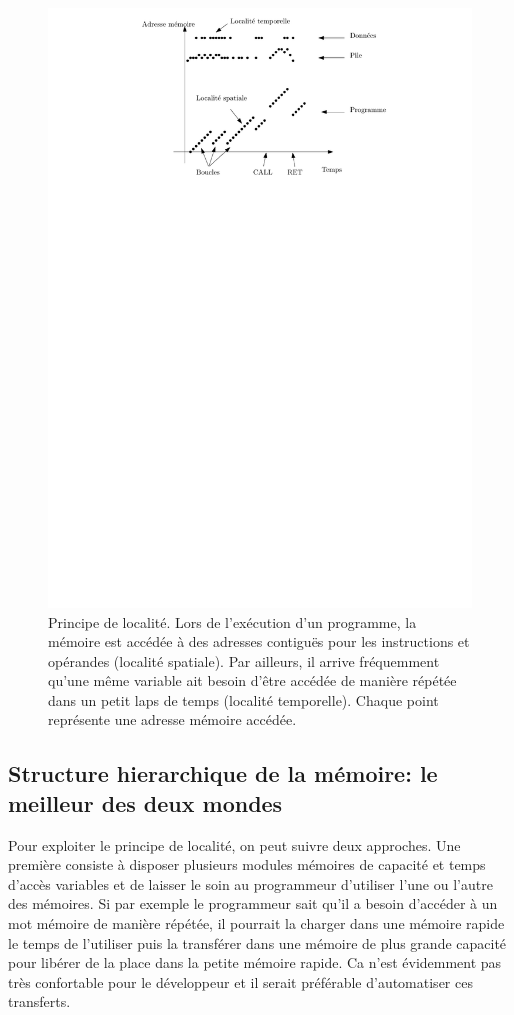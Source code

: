 \begin{figure}[htbp]
\centering\includegraphics[width=0.5\linewidth]{Figs/localite.pdf}
\caption{\label{fig:localite} Principe de localité. Lors de l'exécution d'un programme, la mémoire est accédée à des adresses contiguës pour les instructions et opérandes (localité spatiale). Par ailleurs, il arrive fréquemment qu'une même variable ait besoin d'être accédée de manière répétée dans un petit laps de temps (localité temporelle). Chaque point représente une adresse mémoire accédée.}
\end{figure}


\subsection{Structure hierarchique de la mémoire: le meilleur des deux mondes}

Pour exploiter le principe de localité, on peut suivre deux approches. Une première consiste à disposer plusieurs modules mémoires de capacité et temps d'accès variables et de laisser le soin au programmeur d'utiliser l'une ou l'autre des mémoires. Si par exemple le programmeur sait qu'il a besoin d'accéder à un mot mémoire de manière répétée, il pourrait la charger dans une mémoire rapide le temps de l'utiliser puis la transférer dans une mémoire de plus grande capacité pour libérer de la place dans la petite mémoire rapide. Ca n'est évidemment pas très confortable pour le développeur et il serait préférable d'automatiser ces transferts.

